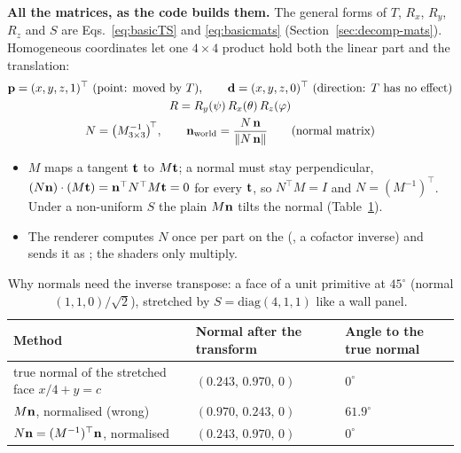 \textbf{All the matrices, as the code builds them.} The general forms of $T$, $R_x$, $R_y$, $R_z$ and $S$ are
Eqs.~\eqref{eq:basicTS} and \eqref{eq:basicmats} (Section~\ref{sec:decomp-mats}). Homogeneous coordinates let one $4\times4$ product hold both the linear part and the
translation:
\begin{gather}
\mathbf{p}=(x,y,z,1)^\top\ \text{(point: moved by } T),\qquad \mathbf{d}=(x,y,z,0)^\top\ \text{(direction: } T \text{ has no effect)}\nonumber\\
R=R_y(\psi)\,R_x(\theta)\,R_z(\varphi)\label{eq:homog}\\
N=\big(M_{3\times3}^{-1}\big)^{\!\top},\qquad \mathbf{n}_{\text{world}}=\frac{N\,\mathbf{n}}{\lVert N\,\mathbf{n}\rVert}\qquad\text{(normal matrix)}\label{eq:normalmat}
\end{gather}
\begin{itemize}
\item $M$ maps a tangent $\mathbf{t}$ to $M\mathbf{t}$; a normal must stay perpendicular, $(N\mathbf{n})\cdot(M\mathbf{t})=\mathbf{n}^\top N^\top M\mathbf{t}=0$
for every $\mathbf{t}$, so $N^\top M=I$ and $N=(M^{-1})^\top$. Under a non-uniform $S$ the plain $M\mathbf{n}$ tilts the normal
(Table~\ref{tab:normalmat}).
\item The renderer computes $N$ once per part on the  (, a cofactor inverse) and sends it as
; the shaders only multiply.
\end{itemize}

\begin{table}[htbp]
\caption{Why normals need the inverse transpose: a face of a unit primitive at $45^\circ$ (normal $(1,1,0)/\sqrt2$), stretched
by $S=\mathrm{diag}(4,1,1)$ like a wall panel.}\label{tab:normalmat}
\centering\small
\begin{tabular}{@{}lll@{}}
\toprule
Method & Normal after the transform & Angle to the true normal\\\midrule
true normal of the stretched face $x/4+y=c$ & $(0.243,\,0.970,\,0)$ & $0^\circ$\\
$M\mathbf{n}$, normalised (wrong) & $(0.970,\,0.243,\,0)$ & $61.9^\circ$\\
$N\mathbf{n}=(M^{-1})^\top\mathbf{n}$, normalised & $(0.243,\,0.970,\,0)$ & $0^\circ$\\
\bottomrule
\end{tabular}
\end{table}

